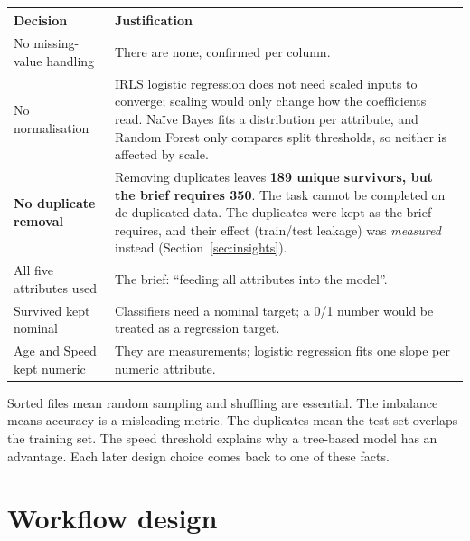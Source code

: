 \documentclass[11pt,a4paper]{article}
\begin{document}
\begin{tabularx}{\linewidth}{@{}p{3.6cm}L@{}}
\toprule
Decision & Justification \\ \midrule
No missing-value handling & There are none, confirmed per column. \\
No normalisation & IRLS logistic regression does not need scaled inputs to converge; scaling would only change
  how the coefficients read. Naïve Bayes fits a distribution per attribute, and Random Forest only compares split
  thresholds, so neither is affected by scale. \\
\textbf{No duplicate removal} & Removing duplicates leaves \textbf{189 unique survivors, but the brief requires 350}.
  The task cannot be completed on de-duplicated data. The duplicates were kept as the brief requires, and their
  effect (train/test leakage) was \emph{measured} instead (Section~\ref{sec:insights}). \\
All five attributes used & The brief: ``feeding all attributes into the model''. \\
Survived kept nominal & Classifiers need a nominal target; a 0/1 number would be treated as a regression target. \\
Age and Speed kept numeric & They are measurements; logistic regression fits one slope per numeric attribute. \\
\bottomrule
\end{tabularx}

\begin{keypoint}
Sorted files mean random sampling and shuffling are essential. The imbalance means accuracy is a misleading
metric. The duplicates mean the test set overlaps the training set. The speed threshold explains why a tree-based
model has an advantage. Each later design choice comes back to one of these facts.
\end{keypoint}

\section{Workflow design}
\end{document}

